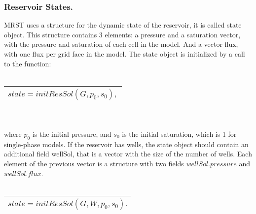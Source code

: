 \documentclass[12pt]{report}
\begin{document}
\subsubsection{Reservoir States.}
MRST uses a structure for the dynamic state of the reservoir, it is called state object.
This structure contains 3 elements: a pressure and a saturation vector,
with the pressure and saturation of each cell in the model. And a vector flux, with one 
flux per grid face in the model.
The state object is initialized by a call to the function:\\\\
\begin{tabular}{|l|}
\hline
 $state=initResSol(G,p_0,s_0),$\\
\hline
\end{tabular}
\\\\where $p_0$ is the initial pressure, and $s_0$ is the initial saturation, 
which is 1 for single-phase models.
If the reservoir has wells, the state object should contain an additional field wellSol, 
that is a vector with
the size of the number of wells. Each element of the previous vector is a structure with two 
fields $wellSol.pressure$ and $wellSol.flux$. 
\\\\
\begin{tabular}{|l|}
\hline
 $state=initResSol(G,W,p_0,s_0).$\\
\hline
\end{tabular}
\end{document}
